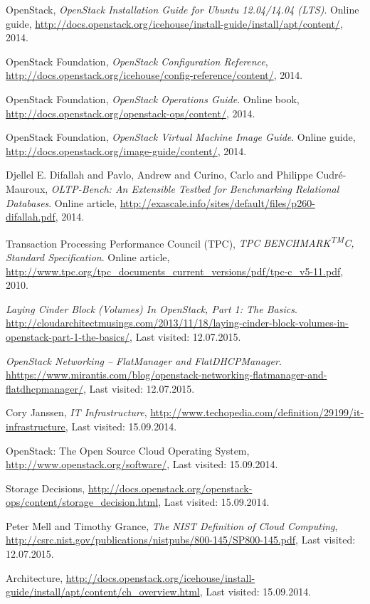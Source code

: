 \begin{thebibliography}{9}

	OpenStack, \emph{OpenStack Installation Guide for Ubuntu 12.04/14.04 (LTS)}. 
	Online guide, 
	\url{http://docs.openstack.org/icehouse/install-guide/install/apt/content/}, 
	2014.

	OpenStack Foundation, \emph{OpenStack Configuration Reference}, 
	\url{http://docs.openstack.org/icehouse/config-reference/content/}, 
	2014.

	OpenStack Foundation, \emph{OpenStack Operations Guide}. 
	Online book,
	\url{http://docs.openstack.org/openstack-ops/content/}, 
	2014.

	OpenStack Foundation, \emph{OpenStack Virtual Machine Image Guide}. 
	Online guide,
	\url{http://docs.openstack.org/image-guide/content/}, 
	2014.

  Djellel E. Difallah and Pavlo, Andrew and Curino, Carlo and Philippe Cudr{\'e}-Mauroux,
  \emph{OLTP-Bench: An Extensible Testbed for Benchmarking Relational Databases}.
  Online article, \url{http://exascale.info/sites/default/files/p260-difallah.pdf}, 
  2014.

  Transaction Processing Performance Council (TPC),
  \emph{TPC BENCHMARK\textsuperscript{TM}C, Standard Specification}.
  Online article, \url{http://www.tpc.org/tpc_documents_current_versions/pdf/tpc-c_v5-11.pdf}, 
  2010.


  \emph{Laying Cinder Block (Volumes) In OpenStack, Part 1: The Basics}.
  \url{http://cloudarchitectmusings.com/2013/11/18/laying-cinder-block-volumes-in-openstack-part-1-the-basics/}, 
  Last visited: 12.07.2015.

  \emph{OpenStack Networking – FlatManager and FlatDHCPManager}.
  \url{hhttps://www.mirantis.com/blog/openstack-networking-flatmanager-and-flatdhcpmanager/}, 
  Last visited: 12.07.2015.


	Cory Janssen,
	\emph{IT Infrastructure}, 
	\url{http://www.techopedia.com/definition/29199/it-infrastructure}, 
	Last visited: 15.09.2014.

	OpenStack: The Open Source Cloud Operating System, 
	\url{http://www.openstack.org/software/}, 
	Last visited: 15.09.2014.

	Storage Decisions, 
	\url{http://docs.openstack.org/openstack-ops/content/storage_decision.html}, 
	Last visited: 15.09.2014.

	Peter Mell and Timothy Grance, \emph{The NIST Definition of Cloud Computing}, 
	\url{http://csrc.nist.gov/publications/nistpubs/800-145/SP800-145.pdf}, 
	Last visited: 12.07.2015.



	Architecture, 
	\url{http://docs.openstack.org/icehouse/install-guide/install/apt/content/ch_overview.html}, 
	Last visited: 15.09.2014.


\end{thebibliography}